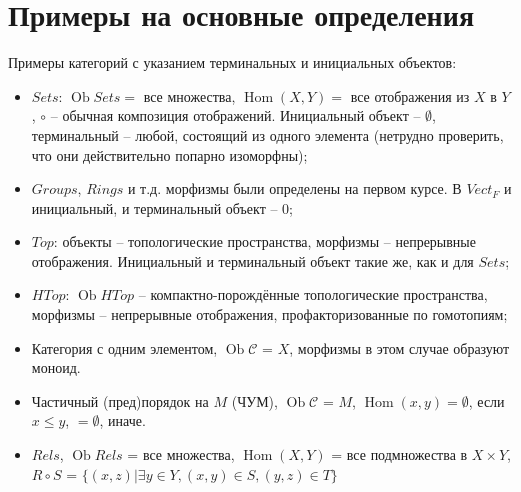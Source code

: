 \documentclass[a4paper]{article}
\theoremstyle{indented}
\theoremstyle{definition}
\theoremstyle{remark}
\DeclareMathOperator{\Ob}{Ob}
\DeclareMathOperator{\Hom}{Hom}
\begin{document}
\section{Примеры на основные определения}
Примеры категорий с указанием терминальных и инициальных объектов: 
\begin{itemize}
    \item $Sets$: $\Ob Sets=$ все множества, $\Hom (X, Y)=$ все отображения из $X$ в $Y$, $\circ $ -- обычная композиция отображений. Инициальный объект -- $\emptyset$, терминальный -- любой, состоящий из одного элемента (нетрудно проверить, что они действительно попарно изоморфны);
    \item $Groups$, $Rings$ и т.д. морфизмы были определены на первом курсе. В $Vect_{F}$ и инициальный, и терминальный объект -- 0;
    \item $Top$: объекты -- топологические пространства, морфизмы -- непрерывные отображения. Инициальный и терминальный объект такие же, как и для $Sets$;
    \item $HTop$: $\Ob HTop$ -- компактно-порождённые топологические пространства, морфизмы -- непрерывные отображения, профакторизованные по гомотопиям;
    \item Категория с одним элементом, $\Ob\mathcal{C}$ = ${X}$, морфизмы в этом случае образуют моноид.
    \item Частичный (пред)порядок на $M$ (ЧУМ), $\Ob\mathcal{C}$ = $M$, $\Hom (x, y) = {\emptyset}$, если $x\leq y$, $=\emptyset$, иначе.
    \item $Rels$, $\Ob Rels$ = все множества, $\Hom (X, Y)$ = все подмножества в $X\times{Y}$, $R\circ  S$ = $\lbrace(x, z) \vert \exists y \in Y, (x, y)\in S, (y, z)\in T\rbrace$
\end{itemize}
\end{document}
